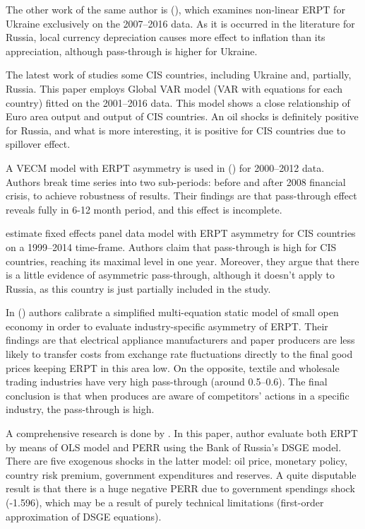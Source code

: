 \documentclass[12pt, a4paper]{extarticle}
\begin{document}
The other work of the same author is (\cite{Faryna2016a}), which examines non-linear ERPT for Ukraine exclusively on the 2007--2016 data. As it is occurred in the literature for Russia, local currency depreciation causes more effect to inflation than its appreciation, although pass-through is higher for Ukraine.

The latest work of \textcite{Faryna2018} studies some CIS countries, including Ukraine and, partially, Russia. This paper employs Global VAR model (VAR with equations for each country) fitted on the 2001--2016 data. This model shows a close relationship of Euro area output and output of CIS countries. An oil shocks is definitely positive for Russia, and what is more interesting, it is positive for CIS countries due to spillover effect.

A VECM model with ERPT asymmetry is used in (\cite{Ponomarev2016}) for 2000--2012 data. Authors break time series into two sub-periods: before and after 2008 financial crisis, to achieve robustness of results. Their findings are that pass-through effect reveals fully in 6-12 month period, and this effect is incomplete.

\cite{Comunale2018} estimate fixed effects panel data model with ERPT asymmetry for CIS countries on a 1999--2014 time-frame. Authors claim that pass-through is high for CIS countries, reaching its maximal level in one year. Moreover, they argue that there is a little evidence of asymmetric pass-through, although it doesn't apply to Russia, as this country is just partially included in the study.

In (\cite{Sinyakov2019}) authors calibrate a simplified multi-equation static model of small open economy in order to evaluate industry-specific asymmetry of ERPT. Their findings are that electrical appliance manufacturers and paper producers are less likely to transfer costs from exchange rate fluctuations directly to the final good prices keeping ERPT in this area low. On the opposite, textile and wholesale trading industries have very high pass-through (around 0.5--0.6). The final conclusion is that when produces are aware of competitors' actions in a specific industry, the pass-through is high.

A comprehensive research is done by \textcite{Khotulev2020}. In this paper, author evaluate both ERPT by means of OLS model and PERR using the Bank of Russia's DSGE model. There are five exogenous shocks in the latter model: oil price, monetary policy, country risk premium, government expenditures and reserves. A quite disputable result is that there is a huge negative PERR due to government spendings shock (-1.596), which may be a result of purely technical limitations (first-order approximation of DSGE equations).
\end{document}
